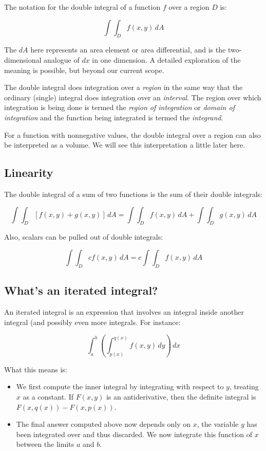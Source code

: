 \documentclass[10pt]{amsart}
\begin{document}
The notation for the double integral of a function $f$ over a region
$D$ is:

$$\int \int_D f(x,y) \, dA$$

The $dA$ here represents an area element or area differential, and is
the two-dimensional analogue of $dx$ in one dimension. A detailed
exploration of the meaning is possible, but beyond our current scope.

The double integral does integration over a {\em region} in the same
way that the ordinary (single) integral does integration over an {\em
interval}. The region over which integration is being done is termed
the {\em region of integration} or {\em domain of integration} and the
function being integrated is termed the {\em integrand}.

For a function with nonnegative values, the double integral over a
region can also be interpreted as a volume. We will see this
interpretation a little later here.

\subsection{Linearity}

The double integral of a sum of two functions is the sum of their
double integrals:

$$\int \int_D [f(x,y) + g(x,y)] \, dA = \int \int_D f(x,y) \, dA + \int \int_D g(x,y) \, dA$$

Also, scalars can be pulled out of double integrals:

$$\int \int_D cf(x,y) \, dA = c \int \int_D f(x,y) \, dA$$

\subsection{What's an iterated integral?}

An iterated integral is an expression that involves an integral inside
another integral (and possibly even more integrals. For instance:

$$\int_a^b \left(\int_{p(x)}^{q(x)} f(x,y) \, dy\right) \, dx$$

What this means is:

\begin{itemize}
\item We first compute the inner integral by integrating with respect
  to $y$, treating $x$ as a constant. If $F(x,y)$ is an
  antiderivative, then the definite integral is $F(x,q(x)) -
  F(x,p(x))$.
\item The final answer computed above now depends only on $x$, the
  variable $y$ has been integrated over and thus discarded. We now
  integrate this function of $x$ between the limits $a$ and $b$.
\end{itemize}
\end{document}
